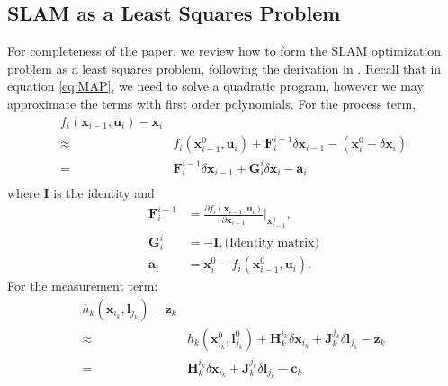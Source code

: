 \appendix
\subsection{SLAM as a Least Squares Problem}
\label{appendix:leastsquare}
For completeness of the paper, we review how to form the SLAM optimization problem as a least squares problem, following the derivation in \cite{isam}. Recall that in equation \ref{eq:MAP}, we need to solve a quadratic program, however we may approximate the terms with first order polynomials. For the process term,
\begin{equation}
\begin{aligned}
f_i(\boldsymbol{x}_{i-1}, \boldsymbol{u}_i) - \boldsymbol{x}_i\\
\approx & {f_i(\boldsymbol{x}_{i-1}^0, \boldsymbol{u}_i)} + \boldsymbol{F}_i^{i-1}\delta \boldsymbol{x}_{i-1} - (\boldsymbol{x}_i^0 + \delta \boldsymbol{x}_i)\\
=& \boldsymbol{F}_i^{i-1}\delta \boldsymbol{x}_{i-1} + \boldsymbol{G}_i^i\delta \boldsymbol{x}_i - \boldsymbol{a}_i \\
\end{aligned}
\label{eq:linearProcessTerm}
\end{equation}
where $\boldsymbol{I}$ is the identity and %
\begin{equation*}
\begin{aligned}
\boldsymbol{F}_i^{i-1} &= \frac{\partial f_i(\boldsymbol{x}_{i-1}, \boldsymbol{u}_i)}{\partial \boldsymbol{x}_{i-1}}|_{\boldsymbol{x}_{i-1}^0}, \label{F} \\%
 \boldsymbol{G}_i^i &= -\boldsymbol{I}, \text{(Identity matrix)}\\%
\boldsymbol{a}_i &= \boldsymbol{x}_i^0 - f_i(\boldsymbol{x}_{i-1}^0, \boldsymbol{u}_i).
\end{aligned}
\end{equation*}
For the measurement term:
\begin{equation}
\begin{aligned}
h_k(\boldsymbol{x}_{i_k}, \boldsymbol{l}_{j_k}) - \boldsymbol{z}_k\\
\approx & {h_k(\boldsymbol{x}_{i_k}^0, \boldsymbol{l}_{j_k}^0) + \boldsymbol{H}_k^{i_k}\delta \boldsymbol{x}_{i_k} + \boldsymbol{J}_k^{j_k}\delta \boldsymbol{l}_{j_k}} - \boldsymbol{z}_k\\
= & {\boldsymbol{H}_k^{i_k}\delta \boldsymbol{x}_{i_k} + \boldsymbol{J}_k^{j_k}\delta \boldsymbol{l}_{j_k}} - \boldsymbol{c}_k\\
\end{aligned}
\label{eq:linearMeasurementTerm}
\end{equation}
